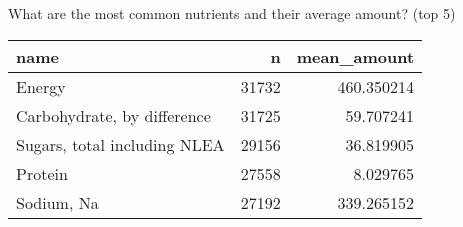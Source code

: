 \documentclass[
]{article}
\newenvironment{Shaded}{\begin{snugshade}}{\end{snugshade}}
\newcommand{\DataTypeTok}[1]{\textcolor[rgb]{0.13,0.29,0.53}{#1}}
\newcommand{\DecValTok}[1]{\textcolor[rgb]{0.00,0.00,0.81}{#1}}
\newcommand{\KeywordTok}[1]{\textcolor[rgb]{0.13,0.29,0.53}{\textbf{#1}}}
\newcommand{\NormalTok}[1]{#1}
\newcommand{\OperatorTok}[1]{\textcolor[rgb]{0.81,0.36,0.00}{\textbf{#1}}}
\newcommand{\StringTok}[1]{\textcolor[rgb]{0.31,0.60,0.02}{#1}}
\begin{document}
What are the most common nutrients and their average amount? (top 5)

\begin{Shaded}
\end{Shaded}

\begin{table}[H]
\centering\begingroup\fontsize{8}{10}\selectfont

\begin{tabular}{lrr}
\toprule
name & n & mean\_amount\\
\midrule
\rowcolor{gray!6}  Energy & 31732 & 460.350214\\
Carbohydrate, by difference & 31725 & 59.707241\\
\rowcolor{gray!6}  Sugars, total including NLEA & 29156 & 36.819905\\
Protein & 27558 & 8.029765\\
\rowcolor{gray!6}  Sodium, Na & 27192 & 339.265152\\
\bottomrule
\end{tabular}
\endgroup{}
\end{table}

\begin{Shaded}
\end{Shaded}
\end{document}
